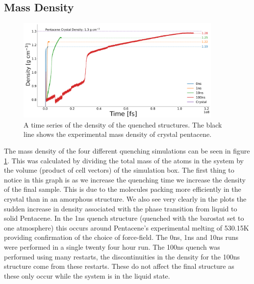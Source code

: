 \subsection{Mass Density}
\begin{figure}[ht]
	\centering
	\includegraphics[width=0.9\textwidth]{../img/DifferentQuenchTimes/Density.png}
	\caption{\label{fig:QuenchDensity}A time series of the density of the quenched structures. The black line shows the experimental mass density of crystal pentacene.}
\end{figure}
\noindent The mass density of the four different quenching simulations can be seen in figure \ref{fig:QuenchDensity}. This was calculated by dividing the total mass of the atoms in the system by the volume (product of cell vectors) of the simulation box. The first thing to notice in this graph is as we increase the quenching time we increase the density of the final sample. This is due to the molecules packing more efficiently in the crystal than in an amorphous structure. We also see very clearly in the plots the sudden increase in density associated with the phase transition from liquid to solid Pentacene. In the 1ns quench structure (quenched with the barostat set to one atmosphere) this occurs around Pentacene's experimental melting of 530.15K \cite{PentaceneMeltingPoint} providing confirmation of the choice of force-field. The 0ns, 1ns and 10ns runs were performed in a single twenty four hour run. The 100ns quench was performed using many restarts, the discontinuities in the density for the 100ns structure come from these restarts. These do not affect the final structure as these only occur while the system is in the liquid state.

